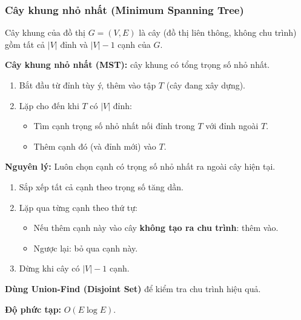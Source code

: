 \documentclass[12pt,a4paper]{article}
\begin{document}
\subsubsection{Cây khung nhỏ nhất (Minimum Spanning Tree)}

\begin{dinhnghia}[title={Cây khung (Spanning Tree)}]
  Cây khung của đồ thị $G = (V,E)$ là cây (đồ thị liên thông, không chu trình) gồm tất cả $|V|$ đỉnh và $|V|-1$ cạnh của $G$.

  \textbf{Cây khung nhỏ nhất (MST):} cây khung có tổng trọng số nhỏ nhất.
\end{dinhnghia}

\begin{phuongphap}[title={Thuật toán Prim (Xây dựng MST từ một đỉnh)}]
  \begin{enumerate}
    \item Bắt đầu từ đỉnh tùy ý, thêm vào tập $T$ (cây đang xây dựng).
    \item Lặp cho đến khi $T$ có $|V|$ đỉnh:
      \begin{itemize}
        \item Tìm cạnh trọng số nhỏ nhất nối đỉnh trong $T$ với đỉnh ngoài $T$.
        \item Thêm cạnh đó (và đỉnh mới) vào $T$.
      \end{itemize}
  \end{enumerate}
  \textbf{Nguyên lý:} Luôn chọn cạnh có trọng số nhỏ nhất ra ngoài cây hiện tại.
\end{phuongphap}

\begin{phuongphap}[title={Thuật toán Kruskal (Xây dựng MST theo cạnh)}]
  \begin{enumerate}
    \item Sắp xếp tất cả cạnh theo trọng số tăng dần.
    \item Lặp qua từng cạnh theo thứ tự:
      \begin{itemize}
        \item Nếu thêm cạnh này vào cây \textbf{không tạo ra chu trình}: thêm vào.
        \item Ngược lại: bỏ qua cạnh này.
      \end{itemize}
    \item Dừng khi cây có $|V|-1$ cạnh.
  \end{enumerate}
  \textbf{Dùng Union-Find (Disjoint Set)} để kiểm tra chu trình hiệu quả.

  \textbf{Độ phức tạp:} $O(E \log E)$.
\end{phuongphap}
\end{document}
